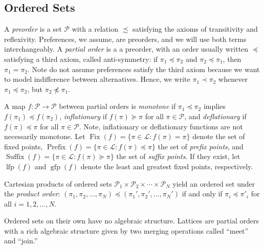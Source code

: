 \documentclass[conference]{ieeeconf}
\renewcommand{\P}{\mathcal{P}}
\renewcommand{\L}{\mathcal{L}}
\DeclareMathOperator{\Fix}{Fix}
\DeclareMathOperator{\Pre}{Prefix}
\DeclareMathOperator{\Post}{Suffix}
\DeclareMathOperator{\lfp}{lfp}
\DeclareMathOperator{\gfp}{gfp}
\newtheorem{lemma}{Lemma}
\begin{document}
\subsection{Ordered Sets}

A \emph{preorder} is a set $\P$ with a relation $\precsim$ satisfying the axioms of transitivity and reflexivity. Preferences, we assume, are preorders, and we will use both terms interchangeably. A \emph{partial order} is a a preorder, with an order usually written $\preceq$ satisfying a third axiom, called anti-symmetry: if $\pi_1 \preceq \pi_2$ and $\pi_2 \preceq \pi_1$, then $\pi_1 = \pi_2$. Note do not assume preferences satisfy the third axiom because we want to model indifference between alternatives. Hence, we write $\pi_1 \prec \pi_2$ whenever $\pi_1 \preceq \pi_2$, but $\pi_2 \not \preceq \pi_1$.

A map $f: \P \to \P$ between partial orders is \emph{monotone} if $\pi_1 \preceq \pi_2$ implies $f(\pi_1) \preceq f(\pi_2)$, \emph{inflationary} if $f(\pi) \succeq \pi$ for all $\pi \in \P$, and \emph{deflationary} if $f(\pi) \preceq \pi$ for all $\pi \in \P$. Note, inflationary or deflationary functions are not necessarily monotone. Let $\Fix(f) = \{ \pi \in \L: f(\pi) = \pi \}$ denote the set of fixed points, $\Pre(f) = \{ \pi \in \L : f(\pi) \preceq \pi\}$ the set of \emph{prefix points}, and $\Post(f) =\{ \pi \in \L : f(\pi) \succeq \pi\}$ the set of \emph{suffix points}. If they exist, let $\lfp(f)$ and $\gfp(f)$ denote the least and greatest fixed points, respectively.

Cartesian products of ordered sets $\P_1 \times \P_2 \times \cdots \times \P_N$ yield an ordered set under the \emph{product order}: $(\pi_1, \pi_2, \dots, \pi_N) \preceq (\pi_1', \pi_2', \dots, \pi_N')$ if and only if $\pi_i \preceq \pi'_i$ for all $i = 1,2,\dots, N$. 


Ordered sets on their own have no algebraic structure. Lattices are partial orders with a rich algebraic structure given by two merging operations called ``meet'' and ``join.''
 
\end{document}
